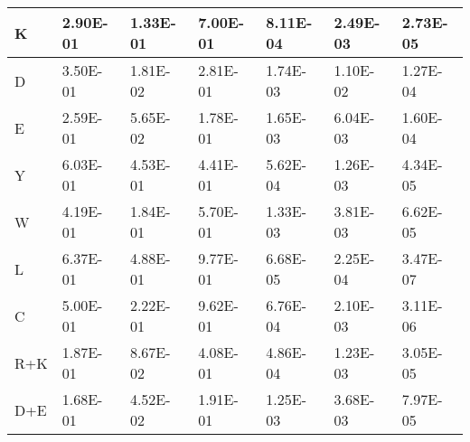 \begin{table}[htbp]
{\begin{tabular}{ p{5em} l l l l l l }
    \midrule
    K    & 2.90E-01 & 1.33E-01 & 7.00E-01 & 8.11E-04 & 2.49E-03 & 2.73E-05 \\
    \midrule
    D    & 3.50E-01 & 1.81E-02 & 2.81E-01 & 1.74E-03 & 1.10E-02 & 1.27E-04 \\
    \midrule
    E    & 2.59E-01 & 5.65E-02 & 1.78E-01 & 1.65E-03 & 6.04E-03 & 1.60E-04 \\
    \midrule
    Y    & 6.03E-01 & 4.53E-01 & 4.41E-01 & 5.62E-04 & 1.26E-03 & 4.34E-05 \\
    \midrule
    W    & 4.19E-01 & 1.84E-01 & 5.70E-01 & 1.33E-03 & 3.81E-03 & 6.62E-05 \\
    \midrule
    L    & 6.37E-01 & 4.88E-01 & 9.77E-01 & 6.68E-05 & 2.25E-04 & 3.47E-07 \\
    \midrule
    C    & 5.00E-01 & 2.22E-01 & 9.62E-01 & 6.76E-04 & 2.10E-03 & 3.11E-06 \\
    \midrule
    R+K & 1.87E-01 & 8.67E-02 & 4.08E-01 & 4.86E-04 & 1.23E-03 & 3.05E-05 \\
    \midrule
    D+E & 1.68E-01 & 4.52E-02 & 1.91E-01 & 1.25E-03 & 3.68E-03 & 7.97E-05 \\
    \bottomrule
    \end{tabular}%
    }%
   \label{table:unihumanbahadur}

\end{table}%

